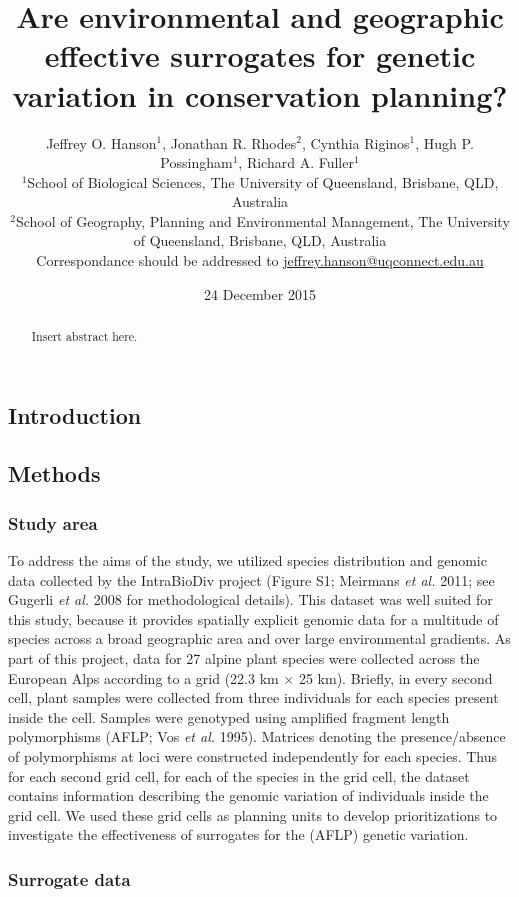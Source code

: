 \documentclass[11pt,]{article}
\title{Are environmental and geographic effective surrogates for genetic
variation in conservation planning?}
\author{Jeffrey O. Hanson$^1$, Jonathan R. Rhodes$^2$, Cynthia Riginos$^1$, Hugh
P. Possingham$^1$, Richard A. Fuller$^1$\\$^1$School of Biological
Sciences, The University of Queensland, Brisbane, QLD,
Australia\\$^2$School of Geography, Planning and Environmental
Management, The University of Queensland, Brisbane, QLD,
Australia\\Correspondance should be addressed to
\href{mailto:jeffrey.hanson@uqconnect.edu.au}{jeffrey.hanson@uqconnect.edu.au}}
\date{24 December 2015}
\begin{document}
\maketitle

\begin{abstract}
Insert abstract here.
\end{abstract}

\subsection{Introduction}\label{introduction}

\subsection{Methods}\label{methods}

\subsubsection{Study area}\label{study-area}

To address the aims of the study, we utilized species distribution and
genomic data collected by the IntraBioDiv project (Figure S1; Meirmans
\emph{et al.} 2011; see Gugerli \emph{et al.} 2008 for methodological
details). This dataset was well suited for this study, because it
provides spatially explicit genomic data for a multitude of species
across a broad geographic area and over large environmental gradients.
As part of this project, data for 27 alpine plant species were collected
across the European Alps according to a grid (22.3 km $\times$ 25 km).
Briefly, in every second cell, plant samples were collected from three
individuals for each species present inside the cell. Samples were
genotyped using amplified fragment length polymorphisms (AFLP; Vos
\emph{et al.} 1995). Matrices denoting the presence/absence of
polymorphisms at loci were constructed independently for each species.
Thus for each second grid cell, for each of the species in the grid
cell, the dataset contains information describing the genomic variation
of individuals inside the grid cell. We used these grid cells as
planning units to develop prioritizations to investigate the
effectiveness of surrogates for the (AFLP) genetic variation.

\subsubsection{Surrogate data}\label{surrogate-data}
\end{document}
